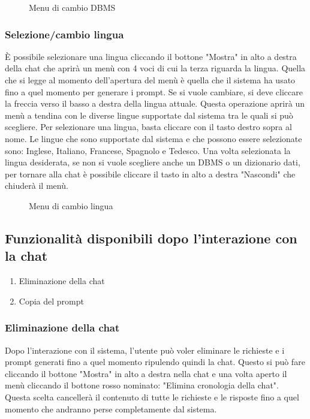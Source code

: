 \begin{figure}[H]
  \centering
  \caption{Menu di cambio DBMS}
\end{figure}

\subsubsection{Selezione/cambio lingua}

È possibile selezionare una lingua cliccando il bottone "Mostra" in alto a destra della chat che aprirà un menù con 4 voci di cui la terza riguarda la lingua. Quella che si legge al momento dell'apertura del menù è quella che il sistema ha usato fino a quel momento per generare i prompt. Se si vuole cambiare, si deve cliccare la freccia verso il basso a destra della lingua attuale. Questa operazione aprirà un menù a tendina con le diverse lingue supportate dal sistema tra le quali si può scegliere. Per selezionare una lingua, basta cliccare con il tasto destro sopra al nome. Le lingue che sono supportate dal sistema e che possono essere selezionate sono: Inglese, Italiano, Francese, Spagnolo e Tedesco. Una volta selezionata la lingua desiderata, se non si vuole scegliere anche un DBMS o un dizionario dati, per tornare alla chat è possibile cliccare il tasto in alto a destra "Nascondi" che chiuderà il menù.

\begin{figure}[H]
  \centering
  \caption{Menu di cambio lingua}
\end{figure}

\subsection{Funzionalità disponibili dopo l'interazione con la chat}

\begin{enumerate}
  \item Eliminazione della chat
  \item Copia del prompt
\end{enumerate}

\subsubsection{Eliminazione della chat}

Dopo l'interazione con il sistema, l'utente può voler eliminare le richieste e i prompt generati fino a quel momento ripulendo quindi la chat. Questo si può fare cliccando il bottone "Mostra" in alto a destra nella chat e una volta aperto il menù cliccando il bottone rosso nominato: "Elimina cronologia della chat". Questa scelta cancellerà il contenuto di tutte le richieste e le risposte fino a quel momento che andranno perse completamente dal sistema.

